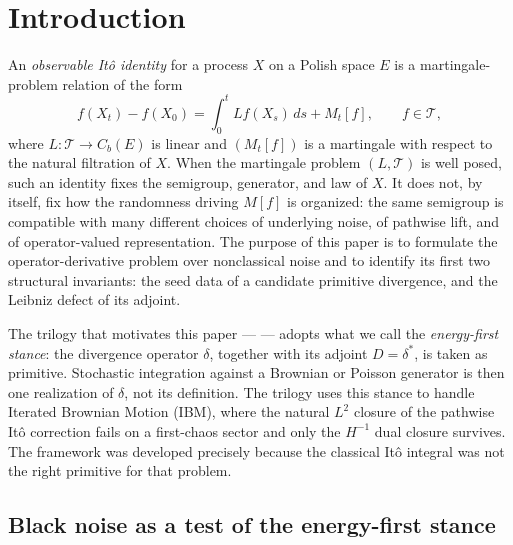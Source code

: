 \documentclass[11pt,reqno]{amsart}
\theoremstyle{plain}
\theoremstyle{definition}
\theoremstyle{remark}
\begin{document}
\maketitle

\section{Introduction}\label{sec:intro}

An \emph{observable It\^o identity} for a process $X$ on a Polish
space $E$ is a martingale-problem relation of the form
\[
  f(X_t) - f(X_0) = \int_0^t Lf(X_s)\,ds + M_t[f], \qquad f\in\mathcal T,
\]
where $L\colon\mathcal T\to C_b(E)$ is linear and $(M_t[f])$ is a
martingale with respect to the natural filtration of $X$. When the
martingale problem $(L,\mathcal T)$ is well posed, such an identity
fixes the semigroup, generator, and law of $X$. It does not, by
itself, fix how the randomness driving $M[f]$ is organized: the same
semigroup is compatible with many different choices of underlying
noise, of pathwise lift, and of operator-valued representation. The
purpose of this paper is to formulate the operator-derivative
problem over nonclassical noise and to identify its first two
structural invariants: the seed data of a candidate primitive
divergence, and the Leibniz defect of its adjoint.

The trilogy that motivates this paper ---
\cite{EnergyFirst,FCDC,BidegreeAtlas} --- adopts what we call the
\emph{energy-first stance}: the divergence operator $\delta$, together
with its adjoint $D=\delta^{*}$, is taken as primitive. Stochastic
integration against a Brownian or Poisson generator is then one
realization of $\delta$, not its definition. The trilogy uses this
stance to handle Iterated Brownian Motion (IBM), where the natural
$L^2$ closure of the pathwise It\^o correction fails on a first-chaos
sector and only the $H^{-1}$ dual closure survives. The framework was
developed precisely because the classical It\^o integral was not the
right primitive for that problem.

\subsection{Black noise as a test of the energy-first stance}\label{sec:intro-blacknoise}
\end{document}
